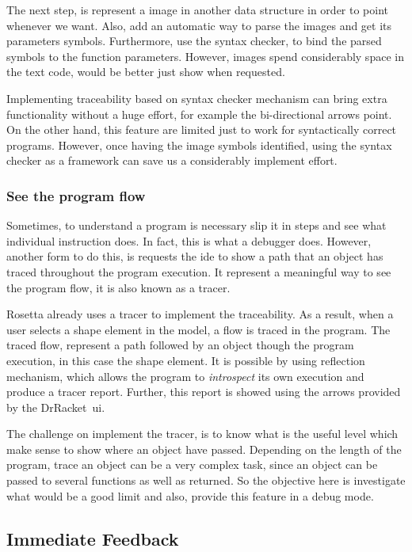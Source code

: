 The next step, is represent a image in another data structure in order to point whenever we want. Also, add an automatic way to parse the images and get its parameters symbols. Furthermore, use the syntax checker, to bind the parsed symbols to the function parameters. However, images spend considerably space in the text code, would be better just show when requested. 

Implementing traceability based on syntax checker mechanism can bring extra functionality without a huge effort, for example the bi-directional arrows point. On the other hand, this feature are limited just to work for syntactically correct programs. However, once having the image symbols identified, using the syntax checker as a framework can save us a considerably implement effort. 

\subsubsection{See the program flow}

Sometimes, to understand a program is necessary slip it in steps and see what individual instruction does. In fact, this is what a debugger does. However, another form to do this, is requests the \ac{ide} to show a path that an object has traced throughout the program execution. It represent a meaningful way to see the program flow, it is also known as a tracer.

Rosetta already uses a tracer to implement the traceability. As a result, when a user selects a shape element in the model, a flow is traced in the program. The traced flow, represent a path followed by an object though the program execution, in this case the shape element. It is possible by using reflection mechanism, which allows the program to \textit{introspect} its own execution and produce a tracer report. Further, this report is showed using the arrows provided by the DrRacket~\ac{ui}.  

The challenge on implement the tracer, is to know what is the useful level which make sense to show where an object have passed. Depending on the length of the program, trace an object can be a very complex task, since an object can be passed to several functions as well as returned. So the objective here is investigate what would be a good limit and also, provide this feature in a debug mode.

\subsection{Immediate Feedback}

